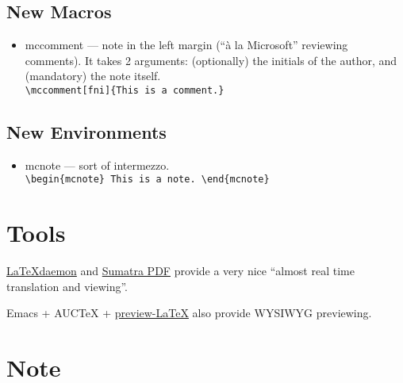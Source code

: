 \documentclass{mcreport}
\begin{document}
\subsection{New Macros}
\label{sec:macros}

\begin{itemize}
    \item mccomment --- note in the left margin (``à la Microsoft''
    reviewing comments). It takes 2 arguments: (optionally) the initials of
    the author, and (mandatory) the note
    itself. \\
    \verb|\mccomment[fni]{This is a comment.}|
\end{itemize}

\subsection{New Environments}
\label{sec:environments}

\begin{itemize}
    \item mcnote --- sort of intermezzo. \\
    \verb|\begin{mcnote} This is a note. \end{mcnote}|
\end{itemize}

% 
% 


\section{Tools}
\label{sec:tools}

\href{http://code.google.com/p/latexdaemon/}{LaTeXdaemon} and
\href{http://blog.kowalczyk.info/software/sumatrapdf/}{Sumatra PDF} provide
a very nice ``almost real time translation and viewing''.

Emacs + AUCTeX +
\href{http://www.gnu.org/software/auctex/preview-latex.html}{preview-LaTeX}
also provide \acs{WYSIWYG} previewing.


\section{Note}
\label{sec:note}
\end{document}
